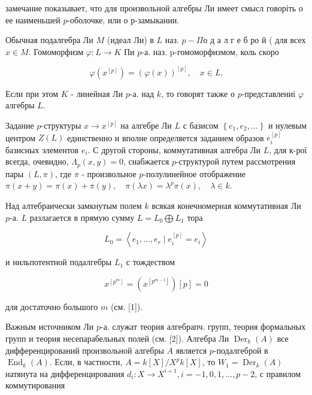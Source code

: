 \documentclass[10pt]{article}
\begin{document}
замечание показывает, что для произвольной алгебры Ли имеет смысл говоріть о ее наименьшей $p$-оболочке, или о р-замыкании.



Обычная подалгебра Ли $M$ (идеал Ли) в $L$ наз. $p-\Pi о$ д а л г е б ро й ( для всех $x \in M$. Гомоморфизм $\varphi: L \rightarrow K$ Пи $p$-а. наз. p-гомоморфизмом, коль скоро



\[

\varphi\left(x^{[p]}\right)=(\varphi(x))^{[p]}, \quad x \in L .

\]



Если при этом $K$ - линейная Ли $p$-а. над $k$, то говорят также о $p$-представлениі $\varphi$ алгебры $L$.



Задание $p$-структуры $x \rightarrow x^{[p]}$ на алгебре Ли $L$ с базисом $\left\{e_{1}, e_{2}, \ldots\right\}$ и нулевым центром $Z(L)$ единственно и вполне определяется заданием образов $e_{i}^{[p]}$ базисных элементов $e_{i}$. С другой стороны, коммутативная алгебра Ли $L$, для к-рої всегда, очевидно, $\Lambda_{p}(x, y)=0$, снабжается $p$-структурой путем рассмотрения пары $(L, \pi)$, где $\pi$ - произвольное $p$-полулинейное отображение $\pi(x+y)=\pi(x)+\pi(y), \quad \pi(\lambda x)=\lambda^{p} \pi(x), \quad \lambda \in k$.



Над алтебраически замкнутым полем $k$ всякая конечномерная коммутативная Ли $p$-а. $L$ разлагается в прямую сумму $L=L_{0} \bigoplus L_{1}$ тора



\[

L_{0}=\left\langle e_{1}, \ldots, e_{r} \mid e_{i}^{[p]}=e_{i}\right\rangle

\]



и нильпотентной подалгебры $L_{1}$ с тождеством



\[

x^{\left[p^{m}\right]}=\left(x^{\left[p^{m-1}\right]}\right)[p]=0

\]



для достаточно большого $m$ (см. [1]).



Важным источником Ли $p$-а. служат теория алгебрапч. групп, теория формальных групп и теория несепарабельных полей (см. [2]). Алгебра Ли $\operatorname{Der}_{k}(A)$ все дифференцирований произвольной алгебры $A$ является $p$-подалгеброй в $\operatorname{End}_{k}(A)$. Если, в частности, $A=k[X] / X^{p} k[X]$, то $W_{1}=\operatorname{Der}_{k}(A)$ натянута на дифференцирования $d_{i}: X \rightarrow X^{i+1}, i=-1,0,1, \ldots, p-2$, с правилом коммутирования
\end{document}
